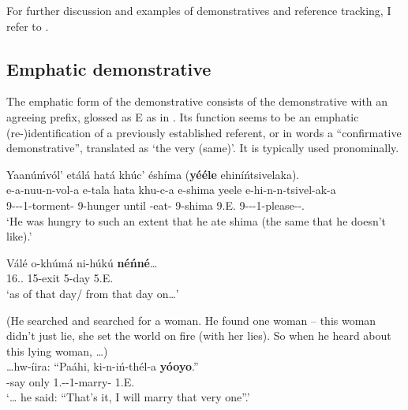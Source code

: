 \documentclass[output=paper]{langscibook}
\begin{document}
For further discussion and examples of demonstratives and reference tracking, I refer to \citet{vanderWal2010}.

\subsection{Emphatic demonstrative}
\label{bkm:Ref109492056}
The emphatic form of the demonstrative consists of the demonstrative with an agreeing prefix, glossed as E as in . Its function seems to be an emphatic (re\nobreakdash-)identification of a previously established referent, or in  words a “confirmative demonstrative”, translated as ‘the very (same)’. It is typically used pronominally.

\ea
\label{bkm:Ref96847545}
Yaanúḿvól’ etálá hatá khúc’ éshíma (\textbf{yééle} ehiníńtsivelaka).\\
\gll
e-a-nuu-n-vol-a  e-tala  hata  khu-c-a   e-shima   yeele  e-hi-n-n-tsivel-ak-a \\
9\SM{}-\PST{}-\PERS{}-1\OM{}-torment-\FV{}  9-hunger  until  \NARR{}-eat-\FV{}  9-shima    9.E\DEM{}.\DIST{}  9-\NEG{}-\PRS{}-1\OM{}-please-\DUR{}-\FV{}.\REL{} \\
\glt
‘He was hungry to such an extent that he ate shima (the same that he doesn’t like).’\\

\z


\ea
\gll
Válé  o-khúmá  ni-húkú  \textbf{né\'{n}né}…\\
16.\DEM{}.\DIST{}  15-exit  5-day  5.E\DEM{}.\DIST{}\\
\glt
‘as of that day/ from that day on…’ \citep[48]{vanderWal2009a}\\

\z

\ea
(He searched and searched for a woman. He found one woman – this woman didn’t just lie, she set the world on fire (with her lies). So when he heard about this lying woman, …)\\
\gll
…hw-íira:  “Paáhi,  ki-n-iń-thél-a  \textbf{yóoyo}.”\\
\NARR{}-say  only  1\SG{}.\SM{}-\PRS{}-1\OM{}-marry-\FV{}  1.E\DEM{}.\MED{}\\
\glt
‘… he said: “That’s it, I will marry that very one”.’\\
\end{document}
